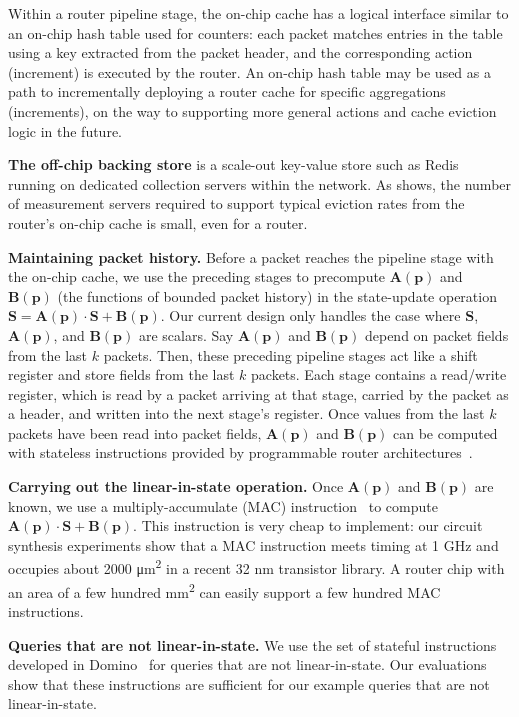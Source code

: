 Within a router pipeline stage, the on-chip cache has a logical interface
similar to an on-chip hash table used for counters:
each packet matches entries in the table using a key
extracted from the packet header, and the corresponding action (\ie increment)
is executed by the router.
%
An on-chip hash table may be used as a path to incrementally deploying a router
cache for specific aggregations (\eg increments), on the way to supporting
more general actions and cache eviction logic in the future.

\textbf{The off-chip backing store} is a scale-out key-value store such as
Redis~\cite{redis} running on dedicated collection servers within the network. As 
shows, the number of measurement servers required to support typical eviction
rates from the router's on-chip cache is small, even for a \hundredgrouter router.

\textbf{Maintaining packet history.} Before a packet reaches the pipeline stage
with the on-chip cache, we use the preceding stages to precompute
$\boldsymbol{A}(\mathbf{p})$ and $\boldsymbol{B}(\mathbf{p})$ (the functions of bounded packet history)
in the state-update operation $\boldsymbol{S} =\boldsymbol{A}(\mathbf{p}) \cdot
\boldsymbol{S} + \boldsymbol{B}(\mathbf{p})$.
Our current design only handles the case
where $\boldsymbol{S}$, $\boldsymbol{A}(\mathbf{p})$, and $\boldsymbol{B}(\mathbf{p})$ are scalars. Say
$\boldsymbol{A}(\mathbf{p})$ and $\boldsymbol{B}(\mathbf{p})$ depend on packet fields from the last $k$
packets. Then, these preceding pipeline stages act like a shift register and
store fields from the last $k$ packets. Each stage contains a read/write
register, which is read by a packet arriving at that stage, carried
by the packet as a header, and written into the next stage's register. Once values from the last
$k$ packets have been read into packet fields, $\boldsymbol{A}(\mathbf{p})$ and
$\boldsymbol{B}(\mathbf{p})$ can be computed with stateless instructions provided by
programmable router architectures~\cite{rmt, domino_sigcomm}.

\textbf{Carrying out the linear-in-state operation.} Once $\boldsymbol{A}(\mathbf{p})$ and
$\boldsymbol{B}(\mathbf{p})$ are known, we use a multiply-accumulate (MAC)
instruction~\cite{mac} to compute $\boldsymbol{A}(\mathbf{p}) \cdot \boldsymbol{S} +
\boldsymbol{B}(\mathbf{p})$. This instruction is very cheap to implement: our circuit
synthesis experiments show that a MAC instruction meets timing at 1 GHz and
occupies about 2000 \si{\micro\metre\squared} in a recent 32 nm transistor
library. A router chip with an area of a few hundred
\si{\milli\meter\squared} can easily support a few hundred MAC instructions.

\textbf{Queries that are not linear-in-state.} We use the set of stateful
instructions developed in Domino~\cite{domino_sigcomm} for queries that are not
linear-in-state. Our evaluations show that these instructions are sufficient
for our example queries that are not linear-in-state.
